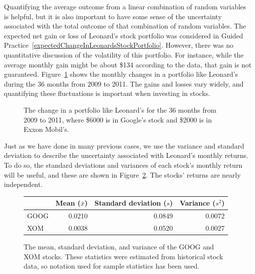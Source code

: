 Quantifying the average outcome from a linear combination of random variables is helpful, but it is also important to have some sense of the uncertainty associated with the total outcome of that combination of random variables. The expected net gain or loss of Leonard's stock portfolio was considered in Guided Practice~\ref{expectedChangeInLeonardsStockPortfolio}. However, there was no quantitative discussion of the volatility of this portfolio. For instance, while the average monthly gain might be about \$134 according to the data, that gain is not guaranteed. Figure~\ref{changeInLeonardsStockPortfolioFor36Months} shows the monthly changes in a portfolio like Leonard's during the 36 months from 2009 to 2011. The gains and losses vary widely, and quantifying these fluctuations is important when investing in stocks.

\begin{figure}[ht]
\centering
{}
\caption{The change in a portfolio like Leonard's for the 36 months from 2009 to 2011, where \$6000 is in Google's stock and \$2000 is in Exxon Mobil's.}
\label{changeInLeonardsStockPortfolioFor36Months}
\end{figure}

Just as we have done in many previous cases, we use the variance and standard deviation to describe the uncertainty associated with Leonard's monthly returns. To do so, the standard deviations and variances of each stock's monthly return will be useful, and these are shown in Figure~\ref{sumStatOfGOOGXOM}. The stocks' returns are nearly independent.

\begin{figure}
\centering
\begin{tabular}{lrrr}
\hline
	& Mean ($\bar{x}$) & Standard deviation ($s$) & Variance ($s^2$) \\
\hline
GOOG & 0.0210	& 0.0849				&	0.0072	\\
XOM & 0.0038		& 0.0520					&	0.0027	\\
\hline
\end{tabular}
\caption{The mean, standard deviation, and variance of the GOOG and XOM stocks. These statistics were estimated from historical stock data, so notation used for sample statistics has been used.}
\label{sumStatOfGOOGXOM}
\end{figure}

